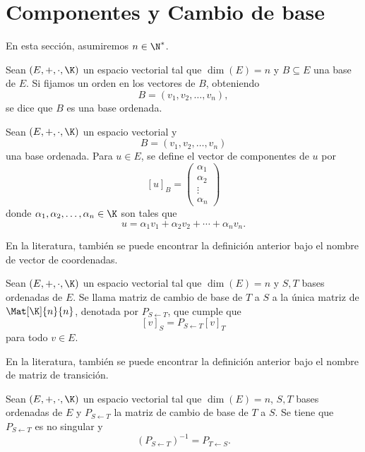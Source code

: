 \documentclass[a4,11pt]{aleph-notas}
\begin{document}
\encabezado

\section{Componentes y Cambio de base}

En esta sección, asumiremos $n\in\N^*$.

\begin{defi}
    Sean $(E,+,\cdot,\K)$ un espacio vectorial tal que $\dim(E)=n$ y $B\subseteq E$ una base de $E$. Si fijamos un orden en los vectores de $B$, obteniendo
    \[
        B=(v_1,v_2,\ldots,v_n),
    \]
    se dice que $B$ es una base ordenada.
\end{defi}

\begin{defi}
    Sean $(E,+,\cdot,\K)$ un espacio vectorial y 
    \[
        B=(v_1,v_2,\ldots,v_n)
    \]
    una base ordenada. Para $u\in E$, se define el vector de componentes de $u$ por
    \[
        [u]_B = \begin{pmatrix}
            \alpha_1\\\alpha_2\\\vdots\\\alpha_n
        \end{pmatrix}
    \]
    donde $\alpha_1,\alpha_2,\ldots,\alpha_n\in\K$ son tales que
    \[
        u = \alpha_1 v_1+\alpha_2 v_2+\cdots+\alpha_n v_n.
    \]
\end{defi}

\begin{advertencia}
    En la literatura, también se puede encontrar la definición anterior bajo el nombre de vector de coordenadas.
\end{advertencia}

\begin{defi}
    Sean $(E,+,\cdot,\K)$ un espacio vectorial tal que $\dim(E)=n$ y $S,T$ bases ordenadas de $E$. Se llama matriz de cambio de base de $T$ a $S$ a la única matriz de $\Mat[\K]{n}{n}$, denotada por $P_{S\gets T}$, que cumple que
    \[
        [v]_S = P_{S\gets T} [v]_T
    \]
    para todo $v\in E$.
\end{defi}

\begin{advertencia}
    En la literatura, también se puede encontrar la definición anterior bajo el nombre de matriz de transición.
\end{advertencia}


\begin{teo}
    Sean $(E,+,\cdot,\K)$ un espacio vectorial tal que $\dim(E)=n$, $S,T$ bases ordenadas de $E$ y $P_{S\gets T}$ la matriz de cambio de base de $T$ a $S$. Se tiene que $P_{S\gets T}$ es no singular y
    \[
        (P_{S\gets T})^{-1} = P_{T\gets S}.
    \]
\end{teo}
\end{document}
